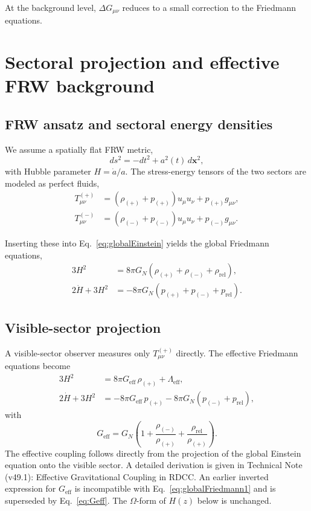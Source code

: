\documentclass[11pt,a4paper]{article}
\begin{document}
At the background level, \(\Delta G_{\mu\nu}\) reduces to a small correction
to the Friedmann equations.

\section{Sectoral projection and effective FRW background}

\subsection{FRW ansatz and sectoral energy densities}

We assume a spatially flat FRW metric,
\begin{equation}
  ds^{2} = -dt^{2} + a^{2}(t)\, d\mathbf{x}^{2},
\end{equation}
with Hubble parameter \(H=\dot{a}/a\). The stress-energy tensors of the two
sectors are modeled as perfect fluids,
\begin{align}
  T^{(+)}_{\mu\nu}
  &=
  (\rho_{(+)}+p_{(+)}) u_{\mu} u_{\nu} + p_{(+)} g_{\mu\nu},
  \\
  T^{(-)}_{\mu\nu}
  &=
  (\rho_{(-)}+p_{(-)}) u_{\mu} u_{\nu} + p_{(-)} g_{\mu\nu}.
\end{align}

Inserting these into Eq.~\eqref{eq:globalEinstein} yields the global
Friedmann equations,
\begin{align}
  3H^{2}
  &=
  8\pi G_N
  \left(
    \rho_{(+)} + \rho_{(-)} + \rho_{\mathrm{rel}}
  \right),
  \label{eq:globalFriedmann1}
  \\
  2\dot{H} + 3H^{2}
  &=
  -8\pi G_N
  \left(
    p_{(+)} + p_{(-)} + p_{\mathrm{rel}}
  \right).
  \label{eq:globalFriedmann2}
\end{align}

\subsection{Visible-sector projection}

A visible-sector observer measures only \(T^{(+)}_{\mu\nu}\) directly. The
effective Friedmann equations become
\begin{align}
  3H^{2}
  &=
  8\pi G_{\mathrm{eff}}\, \rho_{(+)} + \Lambda_{\mathrm{eff}},
  \label{eq:sectorFriedmann1}
  \\
  2\dot{H} + 3H^{2}
  &=
  -8\pi G_{\mathrm{eff}}\, p_{(+)}
  - 8\pi G_N \left( p_{(-)} + p_{\mathrm{rel}} \right),
  \label{eq:sectorFriedmann2}
\end{align}
with
\begin{equation}
  G_{\mathrm{eff}}
  =
  G_N
  \left(
    1
    +
    \frac{\rho_{(-)}}{\rho_{(+)}}
    +
    \frac{\rho_{\mathrm{rel}}}{\rho_{(+)}}
  \right).
  \label{eq:Geff}
\end{equation}
The effective coupling follows directly from the projection of the global
Einstein equation onto the visible sector. A detailed derivation is given
in Technical Note (v49.1): Effective Gravitational Coupling in RDCC. An
earlier inverted expression for \(G_{\mathrm{eff}}\) is incompatible with
Eq.~\eqref{eq:globalFriedmann1} and is superseded by Eq.~\eqref{eq:Geff}.
The \(\Omega\)-form of \(H(z)\) below is unchanged.
\end{document}
